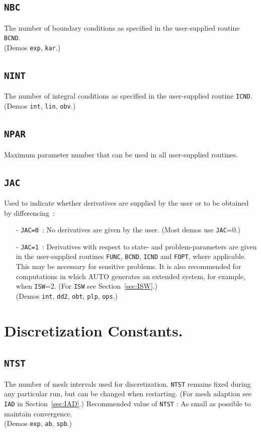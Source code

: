 \documentclass[12pt]{report}
\begin{document}
\subsection{\tt NBC}  \label{sec:NBC}
 The number of boundary conditions as specified in the user-supplied
 routine {\tt BCND}. \\
(Demos {\tt exp}, {\tt kar}.)

\subsection{\tt NINT}  \label{sec:NINT}
 The number of integral conditions as specified in the user-supplied
 routine {\tt ICND}. \\ 
(Demos {\tt int}, {\tt lin}, {\tt obv}.)

\subsection{\tt NPAR} \label{sec:NPAR}
 Maximum parameter number that can be used in all user-supplied
 routines.

\subsection{\tt JAC}  \label{sec:JAC}
 Used to indicate whether derivatives are supplied by the user
 or to be obtained by differencing~:
\begin{itemize}
\item[-] {\tt JAC=0}~: 
  No derivatives are given by the user. (Most demos use {\tt JAC}=0.)
\item[-] {\tt JAC=1}~:  
  Derivatives with respect to state- and problem-parameters are given 
  in the user-supplied routines 
  {\tt FUNC}, {\tt BCND}, {\tt ICND} and {\tt FOPT}, where 
  applicable.  This may be necessary for sensitive problems. 
  It is also recommended for computations in which {\cal AUTO} generates 
  an extended system, for example, when {\tt ISW}=2.
  (For {\tt ISW} see Section~\ref{sec:ISW}.) \\
(Demos {\tt int}, {\tt dd2}, {\tt obt}, {\tt plp}, {\tt ops}.)
\end{itemize}
\section{ Discretization Constants.} \label{sec:Discretization_constants}
\subsection{\tt NTST}  \label{sec:NTST}
 The number of mesh intervals used for discretization.
 {\tt NTST} remains fixed during any particular run, but can be changed
 when restarting. 
 (For mesh adaption see {\tt IAD} in Section~\ref{sec:IAD}.)
 Recommended value of {\tt NTST} : As small as possible to maintain convergence. \\ 
 (Demos {\tt exp}, {\tt ab}, {\tt spb}.)
\end{document}
